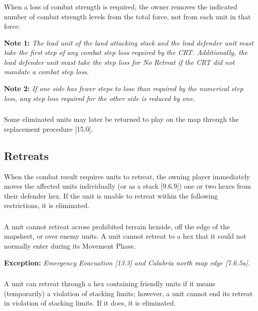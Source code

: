 \subsubsection{}
When a loss of combat strength is required, the owner removes the indicated number of combat strength levels from the total force, not from each unit in that force.

\textbf{Note 1:} \textit{The lead unit of the land attacking stack and the lead defender unit must take the first step of any combat step loss required by the CRT. Additionally, the lead defender unit must take the step loss for No Retreat if the CRT did not mandate a combat step loss.}

\textbf{Note 2:} \textit{If one side has fewer steps to lose than required by the numerical step loss, any step loss required for the other side is reduced by one.}

\subsubsection{}
Some eliminated units may later be returned to play on the map through the replacement procedure [15.0].

\subsection{Retreats}

When the combat result requires units to retreat, the owning player immediately moves the affected units individually (or as a stack [9.6.9]) one or two hexes from their defender hex. If the unit is unable to retreat within the following restrictions, it is eliminated.

\subsubsection{}
A unit cannot retreat across prohibited terrain hexside, off the edge of the mapsheet, or over enemy units. A unit cannot retreat to a hex that it could not normally enter during its Movement Phase.

\textbf{Exception:} \textit{Emergency Evacuation [13.3] and Calabria north map edge [7.6.5a].}

\subsubsection{}
A unit can retreat through a hex containing friendly units if it means (temporarily) a violation of stacking limits; however, a unit cannot end its retreat in violation of stacking limits. If it does, it is eliminated.


